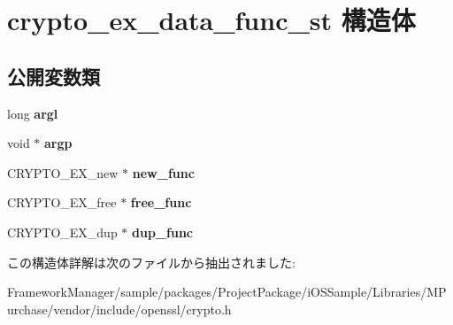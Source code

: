 \hypertarget{structcrypto__ex__data__func__st}{}\section{crypto\+\_\+ex\+\_\+data\+\_\+func\+\_\+st 構造体}
\label{structcrypto__ex__data__func__st}
\subsection*{公開変数類}
\begin{DoxyCompactItemize}
\item 
\hypertarget{structcrypto__ex__data__func__st_a3290d05d491702cb0c8c19e9e8fee261}{}long {\bfseries argl}\label{structcrypto__ex__data__func__st_a3290d05d491702cb0c8c19e9e8fee261}

\item 
\hypertarget{structcrypto__ex__data__func__st_a06d5de8bf9d50af5c74088e9ea10c60d}{}void $\ast$ {\bfseries argp}\label{structcrypto__ex__data__func__st_a06d5de8bf9d50af5c74088e9ea10c60d}

\item 
\hypertarget{structcrypto__ex__data__func__st_a83923e40c83463bdf292ed628af6db05}{}C\+R\+Y\+P\+T\+O\+\_\+\+E\+X\+\_\+new $\ast$ {\bfseries new\+\_\+func}\label{structcrypto__ex__data__func__st_a83923e40c83463bdf292ed628af6db05}

\item 
\hypertarget{structcrypto__ex__data__func__st_acce7bd60712d1319e666f1bd9fbdeabf}{}C\+R\+Y\+P\+T\+O\+\_\+\+E\+X\+\_\+free $\ast$ {\bfseries free\+\_\+func}\label{structcrypto__ex__data__func__st_acce7bd60712d1319e666f1bd9fbdeabf}

\item 
\hypertarget{structcrypto__ex__data__func__st_a3ba1b7f5fec2a001822f70e5862d72b5}{}C\+R\+Y\+P\+T\+O\+\_\+\+E\+X\+\_\+dup $\ast$ {\bfseries dup\+\_\+func}\label{structcrypto__ex__data__func__st_a3ba1b7f5fec2a001822f70e5862d72b5}

\end{DoxyCompactItemize}


この構造体詳解は次のファイルから抽出されました\+:\begin{DoxyCompactItemize}
\item 
Framework\+Manager/sample/packages/\+Project\+Package/i\+O\+S\+Sample/\+Libraries/\+M\+Purchase/vendor/include/openssl/crypto.\+h\end{DoxyCompactItemize}
